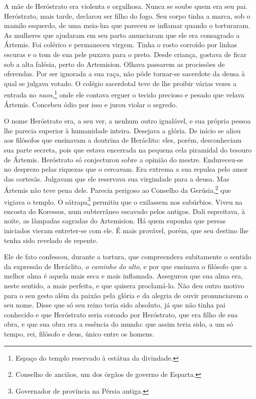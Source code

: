 A mãe de Heróstrato era violenta e orgulhosa. Nunca se soube quem era seu
pai. Heróstrato, mais tarde, declarou ser filho do fogo. Seu corpo tinha a
marca, sob o mamilo esquerdo, de uma meia-lua que pareceu se inflamar
quando o torturaram. As mulheres que ajudaram em seu parto anunciaram que
ele era consagrado a Ártemis. Foi colérico e permaneceu virgem. Tinha o
rosto corroído por linhas escuras e o tom de sua pele puxava para o preto.
Desde criança, gostava de ficar sob a alta falésia, perto do Artemision.
Olhava passarem as procissões de oferendas. Por ser ignorada a sua raça,
não pôde tornar-se sacerdote da deusa à qual se julgava votado. O colégio
sacerdotal teve de lhe proibir várias vezes a entrada no
\textit{naos},\footnote{ Espaço do templo reservado à estátua da divindade.} 
onde ele contava erguer o tecido precioso e pesado que velava
Ártemis. Concebeu ódio por isso e jurou violar o segredo.

O nome Heróstrato era, a seu ver, a nenhum outro igualável, e sua própria
pessoa lhe parecia superior à humanidade inteira. Desejava a glória. De
início se aliou aos filósofos que ensinavam a doutrina de Heráclito: eles,
porém, desconheciam sua parte secreta, pois que estava encerrada na
pequena cela piramidal do tesouro de Ártemis. Heróstrato só conjecturou
sobre a opinião do mestre. Endureceu-se no desprezo pelas riquezas que o
cercavam. Era extrema a sua repulsa pelo amor das cortesãs. Julgavam que
ele reservava sua virgindade para a deusa. Mas Ártemis não teve pena dele.
Parecia perigoso ao Conselho da Gerúsia,\footnote{ Conselho de anciãos, um
dos órgãos de governo de Esparta.} que vigiava o templo. O
sátrapa\footnote{ Governador de província na Pérsia antiga.}
permitiu que o exilassem nos subúrbios. Viveu na encosta do Koressos, num
subterrâneo escavado pelos antigos. Dali espreitava, à noite, as lâmpadas
sagradas do Artemision. Há quem suponha que persas iniciados vieram
entreter-se com ele. É mais provável, porém, que seu destino lhe tenha
sido revelado de repente.

Ele de fato confessou, durante a tortura, que compreendera subitamente o
sentido da expressão de Heráclito, \textit{o caminho do alto}, e por que
ensinava o filósofo que a melhor alma é aquela mais seca e mais inflamada.
Assegurou que sua alma era, neste sentido, a mais perfeita, e que quisera
proclamá-lo. Não deu outro motivo para o seu gesto além da paixão pela
glória e da alegria de ouvir pronunciarem o seu nome. Disse que só seu
reino teria sido absoluto, já que não tinha pai conhecido e que Heróstrato
seria coroado por Heróstrato, que era filho de sua obra, e que sua obra
era a essência do mundo: que assim teria sido, a um só tempo, rei,
filósofo e deus, único entre os homens.

